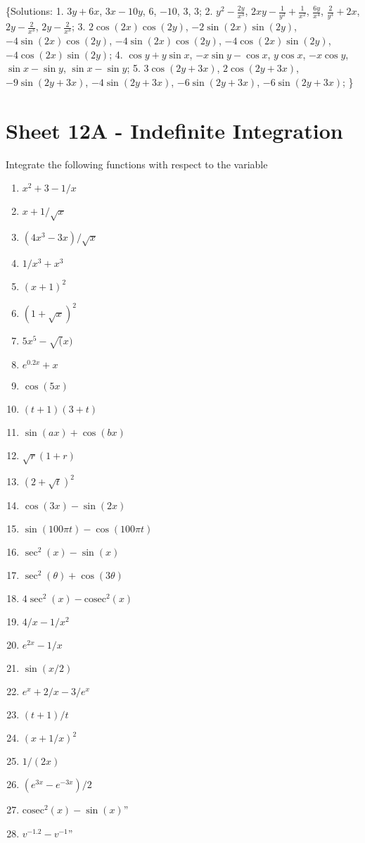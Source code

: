 \documentclass[
  11pt,
  oneside]{book}
\providecommand{\tightlist}{%
  \setlength{\itemsep}{0pt}\setlength{\parskip}{0pt}}
\newcommand{\slide}{}
\theoremstyle{definition}
\theoremstyle{definition}
\theoremstyle{definition}
\theoremstyle{definition}
\theoremstyle{remark}
\begin{document}
\{Solutions:
1. \(3 y + 6 x\), \(3 x - 10 y\), \(6\), \(-10\), \(3\), \(3\);
2. \(y^2-{\frac{2y}{x^3}}\), \(2xy-{\frac{1}{y^2}}+{\frac{1}{x^2}}\), \({\frac{6y}{x^4}}\), \({\frac{2}{y^3}}+2x\), \(2y-{\frac{2}{x^3}}\), \(2y-{\frac{2}{x^3}}\);
3. \(2\cos \left(2x\right)\cos \left(2y\right)\), \(-2\sin \left(2x\right)\sin \left(2y\right)\), \(-4\sin \left(2x\right)\cos \left(2y\right)\), \(-4\sin \left(2x\right)\cos \left(2y\right)\), \(-4\cos \left(2x\right)\sin \left(2y\right)\), \(-4\cos \left(2x\right)\sin \left(2y\right)\);
4. \(\cos y+y\sin x\), \(-x\sin y-\cos x\), \(y\cos x\), \(-x\cos y\), \(\sin x-\sin y\), \(\sin x-\sin y\);
5. \(3\cos \left(2y+3x\right)\), \(2\cos \left(2y+3x\right)\), \(-9\sin \left(2y+3x\right)\), \(-4\sin \left(2y+3x\right)\), \(-6\sin \left(2y+3x\right)\), \(-6\sin \left(2y+3x\right)\);
\}

\slide

\section{Sheet 12A - Indefinite Integration}\label{sheet-12a---indefinite-integration}

Integrate the following functions with respect to the variable

\begin{enumerate}
\def\labelenumi{\arabic{enumi}.}
\tightlist
\item
  \(x^2+3-1/x\)
\item
  \(x+1/\sqrt{x}\)
\item
  \((4x^3-3x)/\sqrt{x}\)
\item
  \(1/x^3+x^3\)
\item
  \((x+1)^2\)
\item
  \((1+\sqrt{x})^2\)
\item
  \(5x^5-\sqrt(x)\)
\item
  \(e^{0.2x}+x\)
\item
  \(\cos(5x)\)
\item
  \((t+1)(3+t)\)
\item
  \(\sin(ax)+\cos(bx)\)
\item
  \(\sqrt{r}(1+r)\)
\item
  \((2+\sqrt{t})^2\)
\item
  \(\cos(3x)-\sin(2x)\)
\item
  \(\sin(100\pi t)-\cos(100\pi t)\)
\item
  \(\sec^2(x)-\sin(x)\)
\item
  \(\sec^2(\theta)+\cos(3\theta)\)
\item
  \(4\sec^2(x)-\text{cosec}^2(x)\)
\item
  \(4/x-1/x^2\)
\item
  \(e^{2x}-1/x\)
\item
  \(\sin(x/2)\)
\item
  \(e^x+2/x-3/e^x\)
\item
  \((t+1)/t\)
\item
  \((x+1/x)^2\)
\item
  \(1/(2x)\)
\item
  \((e^{3x}-e^{-3x})/2\)
\item
  \(\text{cosec}^2(x)-\sin(x)\)''
\item
  \(v^{-1.2}-v^{-1}\)''
\end{enumerate}
\end{document}
